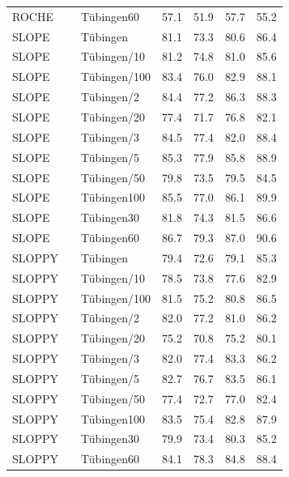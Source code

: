\begin{tabular}{lllllll}
ROCHE &  & Tübingen60 & 57.1 & 51.9 & 57.7 & 55.2 \\
SLOPE &  & Tübingen & 81.1 & 73.3 & 80.6 & 86.4 \\
SLOPE &  & Tübingen/10 & 81.2 & 74.8 & 81.0 & 85.6 \\
SLOPE &  & Tübingen/100 & 83.4 & 76.0 & 82.9 & 88.1 \\
SLOPE &  & Tübingen/2 & 84.4 & 77.2 & 86.3 & 88.3 \\
SLOPE &  & Tübingen/20 & 77.4 & 71.7 & 76.8 & 82.1 \\
SLOPE &  & Tübingen/3 & 84.5 & 77.4 & 82.0 & 88.4 \\
SLOPE &  & Tübingen/5 & 85.3 & 77.9 & 85.8 & 88.9 \\
SLOPE &  & Tübingen/50 & 79.8 & 73.5 & 79.5 & 84.5 \\
SLOPE &  & Tübingen100 & 85.5 & 77.0 & 86.1 & 89.9 \\
SLOPE &  & Tübingen30 & 81.8 & 74.3 & 81.5 & 86.6 \\
SLOPE &  & Tübingen60 & 86.7 & 79.3 & 87.0 & 90.6 \\
SLOPPY &  & Tübingen & 79.4 & 72.6 & 79.1 & 85.3 \\
SLOPPY &  & Tübingen/10 & 78.5 & 73.8 & 77.6 & 82.9 \\
SLOPPY &  & Tübingen/100 & 81.5 & 75.2 & 80.8 & 86.5 \\
SLOPPY &  & Tübingen/2 & 82.0 & 77.2 & 81.0 & 86.2 \\
SLOPPY &  & Tübingen/20 & 75.2 & 70.8 & 75.2 & 80.1 \\
SLOPPY &  & Tübingen/3 & 82.0 & 77.4 & 83.3 & 86.2 \\
SLOPPY &  & Tübingen/5 & 82.7 & 76.7 & 83.5 & 86.1 \\
SLOPPY &  & Tübingen/50 & 77.4 & 72.7 & 77.0 & 82.4 \\
SLOPPY &  & Tübingen100 & 83.5 & 75.4 & 82.8 & 87.9 \\
SLOPPY &  & Tübingen30 & 79.9 & 73.4 & 80.3 & 85.2 \\
SLOPPY &  & Tübingen60 & 84.1 & 78.3 & 84.8 & 88.4 \\
\bottomrule
\end{tabular}
